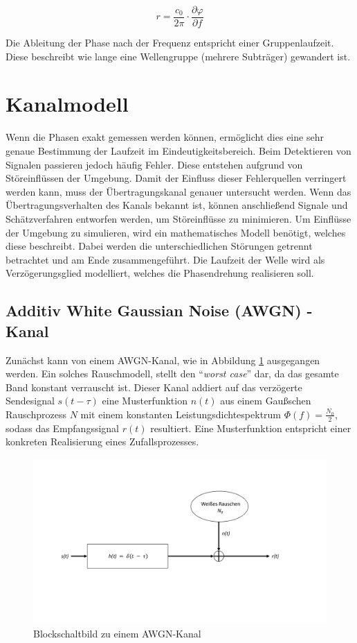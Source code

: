 \begin{equation}
	\label{eq:Phasendifferenz}
	r = \frac{c_0}{2\pi}\cdot\frac{\partial\varphi}{\partial f}
\end{equation}

Die Ableitung der Phase nach der Frequenz entspricht einer Gruppenlaufzeit. Diese beschreibt wie lange eine Wellengruppe (mehrere Subträger) gewandert ist. 


\section{Kanalmodell}
\label{chap2.2:Kanalmodell}
Wenn die Phasen exakt gemessen werden können, ermöglicht dies eine sehr genaue Bestimmung der Laufzeit im Eindeutigkeitsbereich. Beim Detektieren von Signalen passieren jedoch häufig Fehler. Diese entstehen aufgrund von Störeinflüssen der Umgebung. Damit der Einfluss dieser Fehlerquellen verringert werden kann, muss der Übertragungskanal genauer untersucht werden. Wenn das Übertragungsverhalten des Kanals bekannt ist, können anschließend Signale und Schätzverfahren entworfen werden, um Störeinflüsse zu minimieren.   
Um Einflüsse der Umgebung zu simulieren, wird ein mathematisches Modell benötigt, welches diese beschreibt. Dabei werden die unterschiedlichen Störungen getrennt betrachtet und am Ende zusammengeführt. Die Laufzeit der Welle wird als Verzögerungsglied modelliert, welches die Phasendrehung realisieren soll.

\subsection{Additiv White Gaussian Noise (AWGN) - Kanal}
\label{chap2.2.1:AWGN}
Zunächst kann von einem \gls{AWGN}-Kanal, wie in Abbildung \ref{fig: AWGN-Kanal} ausgegangen werden. Ein solches Rauschmodell, stellt den "`\emph{worst case}"' dar, da das gesamte Band konstant verrauscht ist. Dieser Kanal addiert auf das verzögerte Sendesignal $s(t-\tau)$ eine Musterfunktion $n(t)$ aus einem Gaußschen Rauschprozess $N$ mit einem konstanten Leistungsdichtespektrum $\Phi(f) = \frac{N_0}{2}$, sodass das Empfangssignal $r(t)$ resultiert. Eine Musterfunktion entspricht einer konkreten Realisierung eines Zufallsprozesses. 

\begin{figure}[htbp]
\centering
\includegraphics[width = \textwidth]{images/WeisesRauschen}
\caption{Blockschaltbild zu einem AWGN-Kanal}
\label{fig: AWGN-Kanal}
\end{figure}

